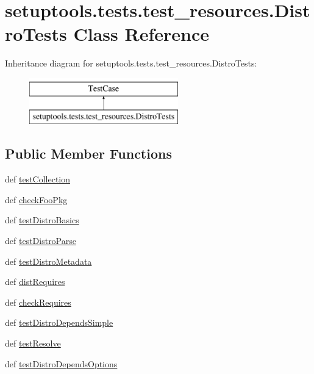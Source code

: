 \hypertarget{classsetuptools_1_1tests_1_1test__resources_1_1DistroTests}{}\section{setuptools.\+tests.\+test\+\_\+resources.\+Distro\+Tests Class Reference}
\label{classsetuptools_1_1tests_1_1test__resources_1_1DistroTests}
Inheritance diagram for setuptools.\+tests.\+test\+\_\+resources.\+Distro\+Tests\+:\begin{figure}[H]
\begin{center}
\leavevmode
\includegraphics[height=2.000000cm]{classsetuptools_1_1tests_1_1test__resources_1_1DistroTests}
\end{center}
\end{figure}
\subsection*{Public Member Functions}
\begin{DoxyCompactItemize}
\item 
def \hyperlink{classsetuptools_1_1tests_1_1test__resources_1_1DistroTests_a494871c2a35a267de398cb66ec9c49e1}{test\+Collection}
\item 
def \hyperlink{classsetuptools_1_1tests_1_1test__resources_1_1DistroTests_a7623d716482ffccc6854ae86402b07b8}{check\+Foo\+Pkg}
\item 
def \hyperlink{classsetuptools_1_1tests_1_1test__resources_1_1DistroTests_a566cb7c28229034c008008e549ad7e5e}{test\+Distro\+Basics}
\item 
def \hyperlink{classsetuptools_1_1tests_1_1test__resources_1_1DistroTests_a2122e614bf69a7460c91d4846c395638}{test\+Distro\+Parse}
\item 
def \hyperlink{classsetuptools_1_1tests_1_1test__resources_1_1DistroTests_a5d270884f02af84d5d91f88fae93a9d0}{test\+Distro\+Metadata}
\item 
def \hyperlink{classsetuptools_1_1tests_1_1test__resources_1_1DistroTests_a7fec5358a8b9d1809b1e72027ec95483}{dist\+Requires}
\item 
def \hyperlink{classsetuptools_1_1tests_1_1test__resources_1_1DistroTests_adeaf9c0760eca5689eb53930f0b855d5}{check\+Requires}
\item 
def \hyperlink{classsetuptools_1_1tests_1_1test__resources_1_1DistroTests_a650055bf27693d82d4ceb437ad29bb41}{test\+Distro\+Depends\+Simple}
\item 
def \hyperlink{classsetuptools_1_1tests_1_1test__resources_1_1DistroTests_abe2a02643201e6f825def7a3fb14c37e}{test\+Resolve}
\item 
def \hyperlink{classsetuptools_1_1tests_1_1test__resources_1_1DistroTests_a7f683249cfddcf65eb39131ef5c38460}{test\+Distro\+Depends\+Options}
\end{DoxyCompactItemize}


